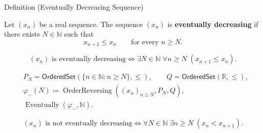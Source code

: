\begin{definitionbox}{Definition (Eventually Decreasing Sequence)}
\begin{definition}
\label{def:eventually-decreasing-sequence}
Let $(x_n)$ be a real sequence. The sequence $(x_n)$ is
\textbf{eventually decreasing} if there exists $N\in\mathbb{N}$ such that
\[
  x_{n+1} \le x_n
  \qquad
  \text{for every } n\ge N.
\]
\end{definition}
\end{definitionbox}

\begin{remark*}
\[
(x_n)\text{ is eventually decreasing}
\Longleftrightarrow
\exists N\in\mathbb{N}\;\forall n\ge N\;(x_{n+1}\le x_n).
\]
\end{remark*}

\begin{remark*}
\[
\begin{aligned}
&P_N=\mathsf{OrderedSet}(\{n\in\mathbb{N}:n\ge N\},\leq),\qquad
Q=\mathsf{OrderedSet}(\mathbb{R},\leq),\\
&\varphi_{-}(N)\coloneqq
\operatorname{OrderReversing}((x_n)_{n\ge N},P_N,Q),\\
&\operatorname{Eventually}(\varphi_{-},\mathbb{N}).
\end{aligned}
\]
\end{remark*}

\begin{remark*}
\[
(x_n)\text{ is not eventually decreasing}
\Longleftrightarrow
\forall N\in\mathbb{N}\;\exists n\ge N\;(x_n<x_{n+1}).
\]
\end{remark*}

